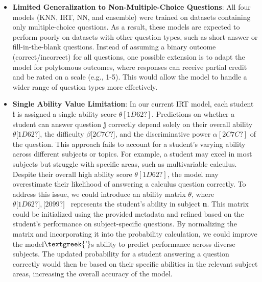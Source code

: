 \documentclass[letterpaper]{article}
\begin{document}
\bigskip

\begin{itemize}[resume*=listWWNumxi]
\item \textbf{Limited Generalization to Non-Multiple-Choice Questions}: All four models (KNN, IRT, NN, and ensemble)
were trained on datasets containing only multiple-choice questions. As a result, these models are expected to perform
poorly on datasets with other question types, such as short-answer or fill-in-the-blank questions. Instead of assuming
a binary outcome (correct/incorrect) for all questions, one possible extension is to adapt the model for polytomous
outcomes, where responses can receive partial credit and be rated on a scale (e.g., 1-5). This would allow the model to
handle a wider range of question types more effectively.
\end{itemize}

\bigskip

\begin{itemize}[resume*=listWWNumxi]
\item \textbf{Single Ability Value Limitation}: In our current IRT model, each student \textbf{i} is assigned a single
ability score \textbf{$\theta [1D62?]$}. Predictions on whether a student can answer question \textbf{j} correctly
depend solely on their overall ability  $\mathit{\theta \text{[1D62?]}}$, the difficulty  $\mathit{\beta
\text{[2C7C?]}}$, and the discriminative power \textbf{$\alpha [2C7C?]$} of the question. This approach fails to
account for a student's varying ability across different subjects or topics. For example, a student may excel in most
subjects but struggle with specific areas, such as multivariable calculus. Despite their overall high ability score
\textbf{$\theta [1D62?]$}, the model may overestimate their likelihood of answering a calculus question correctly. To
address this issue, we could introduce an ability matrix \textbf{$\theta $}, where  $\mathit{\theta
\text{[1D62?]}},\text{[2099?]}$ \ represents the student's ability in subject \textbf{n}. This matrix could be
initialized using the provided metadata and refined based on the student's performance on subject-specific questions.
By normalizing the matrix and incorporating it into the probability calculation, we could improve the
model$\text{\textgreek{’}}$s ability to predict performance across diverse subjects. The updated probability for a
student answering a question correctly would then be based on their specific abilities in the relevant subject areas,
increasing the overall accuracy of the model.
\end{itemize}

\bigskip


\bigskip
\end{document}
